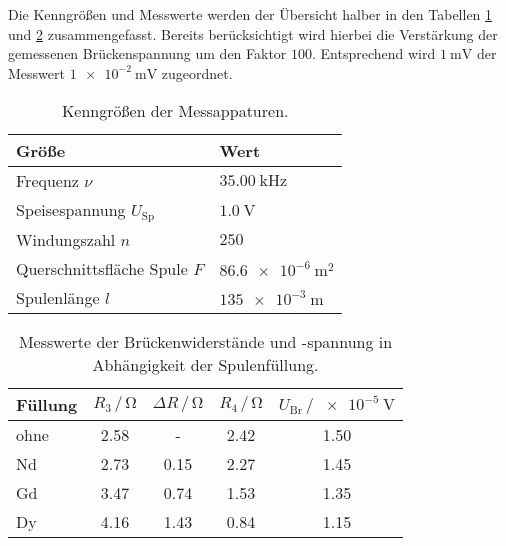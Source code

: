     Die Kenngrößen und Messwerte werden der Übersicht halber in den Tabellen \ref{tab:KennGr} und \ref{tab:Messwerte} zusammengefasst.
    Bereits berücksichtigt wird hierbei die Verstärkung der gemessenen Brückenspannung um den Faktor $100$. Entsprechend 
    wird $\SI{1}{\milli\volt}$ der Messwert $\SI{1e-2}{\milli\volt}$ zugeordnet.
    \begin{table}
        \centering
        \caption{Kenngrößen der Messappaturen.}
        \label{tab:KennGr}
        \begin{tabular}{l l}
            \toprule
            Größe & Wert \\
            \midrule
            Frequenz $\nu$                  & $\SI{35.00}{\kilo\hertz}$ \\
            Speisespannung $U_\text{Sp}$    & $\SI{1.0}{\volt}$ \\
            Windungszahl $n$                & $\num{250}$ \\
            Querschnittsfläche Spule $F$    & $\SI{86.6e-6}{\meter\squared}$ \\
            Spulenlänge $l$                 & $\SI{135e-3}{\meter}$ \\
            \bottomrule
        \end{tabular}
    \end{table}
    \begin{table}
        \centering
        \caption{Messwerte der Brückenwiderstände und -spannung in Abhängigkeit der Spulenfüllung.}
        \label{tab:Messwerte}
        \begin{tabular}{l c c c c}
            \toprule
            Füllung & $R_3\,/\,\si{\ohm}$ & $\Delta R\,/\,\si{\ohm}$ & $R_4\,/\,\si{\ohm}$ & $U_\text{Br}\,/\,\SI{e-5}{\volt}$ \\
            \midrule
            ohne    & 2.58 &  -   & 2.42 & 1.50 \\ 
            Nd      & 2.73 & 0.15 & 2.27 & 1.45 \\
            Gd      & 3.47 & 0.74 & 1.53 & 1.35 \\
            Dy      & 4.16 & 1.43 & 0.84 & 1.15 \\
            \bottomrule
        \end{tabular}
    \end{table}
    
